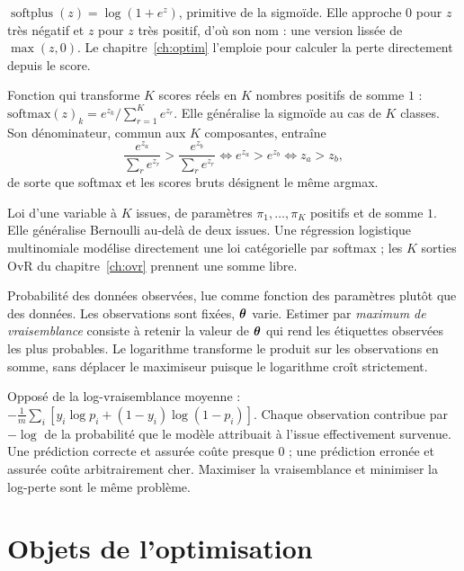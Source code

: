 \begin{description}[style=nextline,leftmargin=0pt]
  \item[\dsym{softplus}{Softplus}]
  $\operatorname{softplus}(z)=\log(1+e^z)$, primitive de la sigmoïde. Elle
  approche $0$ pour $z$ très négatif et $z$ pour $z$ très positif, d'où son nom :
  une version lissée de $\max(z,0)$. Le chapitre~\ref{ch:optim} l'emploie pour
  calculer la perte directement depuis le score.

  \item[\dsym{softmax}{Softmax}]
  Fonction qui transforme $K$ scores réels en $K$ nombres positifs de somme $1$ :
  $\mathrm{softmax}(z)_k=e^{z_k}/\sum_{r=1}^K e^{z_r}$. Elle généralise la
  sigmoïde au cas de $K$ classes. Son dénominateur, commun aux $K$ composantes,
  entraîne
  \[
    \frac{e^{z_a}}{\sum_r e^{z_r}}>\frac{e^{z_b}}{\sum_r e^{z_r}}
    \iff e^{z_a}>e^{z_b}
    \iff z_a>z_b,
  \]
  de sorte que softmax et les scores bruts désignent le même argmax.

  \item[\dsym{categorielle}{Loi catégorielle}]
  Loi d'une variable à $K$ issues, de paramètres $\pi_1,\ldots,\pi_K$ positifs et
  de somme $1$. Elle généralise Bernoulli au-delà de deux issues. Une régression
  logistique multinomiale modélise directement une loi catégorielle par softmax ;
  les $K$ sorties OvR du chapitre~\ref{ch:ovr} prennent une somme libre.

  \item[\dsym{vraisemblance}{Vraisemblance}]
  Probabilité des données observées, lue comme fonction des paramètres plutôt que
  des données. Les observations sont fixées, $\boldsymbol{\theta}$ varie. Estimer par
  \emph{maximum de vraisemblance} consiste à retenir la valeur de $\boldsymbol{\theta}$ qui rend
  les étiquettes observées les plus probables. Le logarithme transforme le produit
  sur les observations en somme, sans déplacer le maximiseur puisque le logarithme
  croît strictement.

  \item[\dsym{logperte}{Log-perte, ou entropie croisée binaire}]
  Opposé de la log-vraisemblance moyenne :
  $-\frac1m\sum_i[y_i\log p_i+(1-y_i)\log(1-p_i)]$. Chaque observation contribue
  par $-\log$ de la probabilité que le modèle attribuait à l'issue effectivement
  survenue. Une prédiction correcte et assurée coûte presque $0$ ; une prédiction
  erronée et assurée coûte arbitrairement cher. Maximiser la vraisemblance et
  minimiser la log-perte sont le même problème.
\end{description}

\section{Objets de l'optimisation}
\label{sec:objets-optim}

